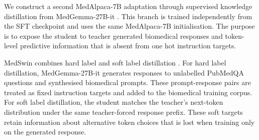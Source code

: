 \documentclass[conference]{IEEEtran}
\begin{document}



We construct a second MedAlpaca-7B adaptation through supervised knowledge distillation from MedGemma-27B-it \cite{han2023medalpaca,google2025medgemma}. This branch is trained independently from the SFT checkpoint and uses the same MedAlpaca-7B initialisation. The purpose is to expose the student to teacher generated biomedical responses and token-level predictive information that is absent from one hot instruction targets.

MedSwin combines hard label and soft label distillation \cite{hinton2015distilling}. For hard label distillation, MedGemma-27B-it generates responses to unlabelled PubMedQA questions and synthesised biomedical prompts. These prompt-response pairs are treated as fixed instruction targets and added to the biomedical training corpus. For soft label distillation, the student matches the teacher's next-token distribution under the same teacher-forced response prefix. These soft targets retain information about alternative token choices that is lost when training only on the generated response.
\end{document}
